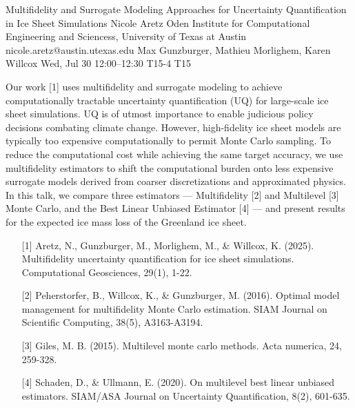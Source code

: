 \begin{talk}
  {Multifidelity and Surrogate Modeling Approaches for Uncertainty Quantification in Ice Sheet Simulations}%
  {Nicole Aretz}%
  {Oden Institute for Computational Engineering and Sciencess, University of Texas at Austin}%
  {nicole.aretz@austin.utexas.edu}%
  {Max Gunzburger, Mathieu Morlighem, Karen Willcox}%
  {}%
  {Wed, Jul 30 12:00–12:30}%
  {T15-4}%
  {T15}%
  
				
			
Our work [1] uses multifidelity and surrogate modeling to achieve computationally tractable uncertainty quantification (UQ) for large-scale ice sheet simulations. UQ is of utmost importance to enable judicious policy decisions combating climate change. However, high-fidelity ice sheet models are typically too expensive computationally to permit Monte Carlo sampling. To reduce the computational cost while achieving the same target accuracy, we use multifidelity estimators to shift the computational burden onto less expensive surrogate models derived from coarser discretizations and approximated physics. In this talk, we compare three estimators — Multifidelity [2] and Multilevel [3] Monte Carlo, and the Best Linear Unbiased Estimator [4] — and present results for the expected ice mass loss of the Greenland ice sheet.

\medskip

\begin{enumerate}
	\item[{[1]}] Aretz, N., Gunzburger, M., Morlighem, M., \& Willcox, K. (2025). Multifidelity uncertainty quantification for ice sheet simulations. Computational Geosciences, 29(1), 1-22.
	\item[{[2]}] Peherstorfer, B., Willcox, K., \& Gunzburger, M. (2016). Optimal model management for multifidelity Monte Carlo estimation. SIAM Journal on Scientific Computing, 38(5), A3163-A3194.
    \item[{[3]}] Giles, M. B. (2015). Multilevel monte carlo methods. Acta numerica, 24, 259-328.
    \item[{[4]}] Schaden, D., \& Ullmann, E. (2020). On multilevel best linear unbiased estimators. SIAM/ASA Journal on Uncertainty Quantification, 8(2), 601-635.
\end{enumerate}

\end{talk}


